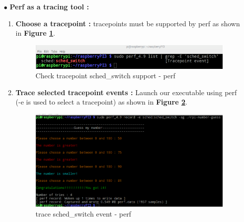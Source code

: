 \begin{itemize}
\begin{itemize}
    				
	\end{itemize}

	
	
	


	
	
	
	\item[$\bullet$] \textbf{Perf as a tracing tool : }
		\begin{enumerate}
			\item \textbf{Choose a tracepoint : } tracepoints must be supported by perf as shown in \textbf{Figure \ref{Check tracepoint support - perf}}.
					\begin{figure}[H]
						\centering
        				\includegraphics[scale=0.4]{img/solution/check-sched-switch-support-perf.png}
        				\caption{Check tracepoint sched\_switch support - perf}
        				\label{Check tracepoint support - perf}
    				\end{figure}		
			
			\item \textbf{Trace selected tracepoint events : } Launch our executable using perf (-e is used to select a tracepoint) as shown in \textbf{Figure \ref{trace sched-switch event - perf}}.
					\begin{figure}[H]
						\centering
        				\includegraphics[scale=0.4]{img/solution/trace-sched-switch-perf.png}
        				\caption{trace sched\_switch event - perf}
        				\label{trace sched-switch event - perf}
    				\end{figure}			
			

\end{enumerate}
\end{itemize}
